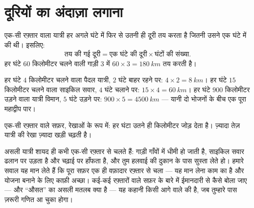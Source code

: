 \section{दूरियों का अंदाज़ा लगाना}

\begin{proposition}[चाल से दूरी]\label{prop:g5:speed-distance-time:distance}
एक-सी रफ़्तार वाला यात्री हर अगले घंटे में फिर से उतनी ही दूरी तय करता
है जितनी उसने एक घंटे में की थी। इसलिए:
\[
\text{तय की गई दूरी} = \text{एक घंटे की दूरी} \times
\text{घंटों की संख्या}.
\]
हर घंटे $60$ किलोमीटर चलने वाली गाड़ी $3$  में
$60 \times 3 = \qty{180}{km}$ तय करती है।
\end{proposition}

\begin{example}[सफ़र के सवाल]\label{ex:g5:speed-distance-time:journeys}
हर घंटे $4$ किलोमीटर चलने वाला पैदल यात्री, $2$ घंटे बाहर रहने पर:
$4 \times 2 = \qty{8}{km}$। हर घंटे $15$ किलोमीटर चलने वाला साइकिल
सवार, $4$ घंटे चलाने पर: $15 \times 4 = \qty{60}{km}$। हर घंटे $900$
किलोमीटर उड़ने वाला यात्री विमान, $5$ घंटे उड़ने पर: $900 \times 5 =
\qty{4500}{km}$ --- यानी दो भोजनों के बीच एक पूरा महाद्वीप पार।
\end{example}

\begin{omfigure}

{\small एक-सी रफ़्तार वाले सफ़र, रेखाओं के रूप में: हर घंटा उतने ही
किलोमीटर जोड़ देता है। ज़्यादा तेज़ यात्री की रेखा ज़्यादा खड़ी चढ़ती
है।}
\end{omfigure}

\begin{remark}\label{rem:g5:speed-distance-time:steady}
असली यात्री शायद ही कभी एक-सी रफ़्तार से चलते हैं: गाड़ी गाँवों में
धीमी हो जाती है, साइकिल सवार ढलान पर उड़ता है और चढ़ाई पर हाँफता है,
और तुम हलवाई की दुकान के पास सुस्ता लेते हो। हमारे सवाल यह मान लेते
हैं कि पूरा सफ़र एक ही वफ़ादार रफ़्तार से चला --- यह मान लेना काम का
है और योजना बनाने के लिए काफ़ी अच्छा। कई-कई रफ़्तारों वाले सफ़र के
बारे में ईमानदारी से कैसे बोला जाए --- और ``औसत'' का असली मतलब क्या है
--- यह कहानी किसी आगे वाले  की है, जब तुम्हारे पास ज़रूरी गणित आ
चुका होगा।
\end{remark}


